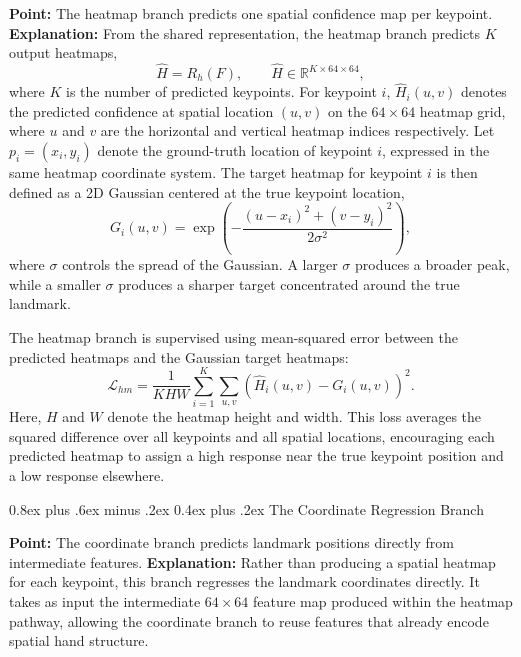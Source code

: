 \documentclass[10pt,letterpaper]{article}
\makeatletter
\renewcommand\subsubsection{\@startsection{subsubsection}{3}{\z@}%
  {0.8ex plus .6ex minus .2ex}%
  {0.4ex plus .2ex}%
  {\normalfont\small\itshape}}
\makeatother
\begin{document}
\noindent\textbf{Point:} The heatmap branch predicts one spatial confidence map per keypoint.  
\textbf{Explanation:} From the shared representation, the heatmap branch predicts \(K\) output heatmaps,
\begin{equation}
\hat{H} = R_h(F), \qquad \hat{H} \in \mathbb{R}^{K \times 64 \times 64},
\label{eq:heatmap-output}
\end{equation}
where \(K\) is the number of predicted keypoints. For keypoint \(i\), \(\hat{H}_i(u,v)\) denotes the predicted confidence at spatial location \((u,v)\) on the \(64 \times 64\) heatmap grid, where \(u\) and \(v\) are the horizontal and vertical heatmap indices respectively. Let \(p_i = (x_i, y_i)\) denote the ground-truth location of keypoint \(i\), expressed in the same heatmap coordinate system. The target heatmap for keypoint \(i\) is then defined as a 2D Gaussian centered at the true keypoint location,
\begin{equation}
G_i(u,v) = \exp\left(
-\frac{(u-x_i)^2 + (v-y_i)^2}{2\sigma^2}
\right),
\label{eq:gaussian-target}
\end{equation}
where \(\sigma\) controls the spread of the Gaussian. A larger \(\sigma\) produces a broader peak, while a smaller \(\sigma\) produces a sharper target concentrated around the true landmark.

The heatmap branch is supervised using mean-squared error between the predicted heatmaps and the Gaussian target heatmaps:
\begin{equation}
\mathcal{L}_{hm}
=
\frac{1}{KHW}
\sum_{i=1}^{K}
\sum_{u,v}
\left(\hat{H}_i(u,v) - G_i(u,v)\right)^2.
\label{eq:heatmap-loss}
\end{equation}
Here, \(H\) and \(W\) denote the heatmap height and width. This loss averages the squared difference over all keypoints and all spatial locations, encouraging each predicted heatmap to assign a high response near the true keypoint position and a low response elsewhere. 

\subsubsection{The Coordinate Regression Branch}

\noindent\textbf{Point:} The coordinate branch predicts landmark positions directly from intermediate features.  
\textbf{Explanation:} Rather than producing a spatial heatmap for each keypoint, this branch regresses the landmark coordinates directly. It takes as input the intermediate \(64 \times 64\) feature map produced within the heatmap pathway, allowing the coordinate branch to reuse features that already encode spatial hand structure.
\end{document}
